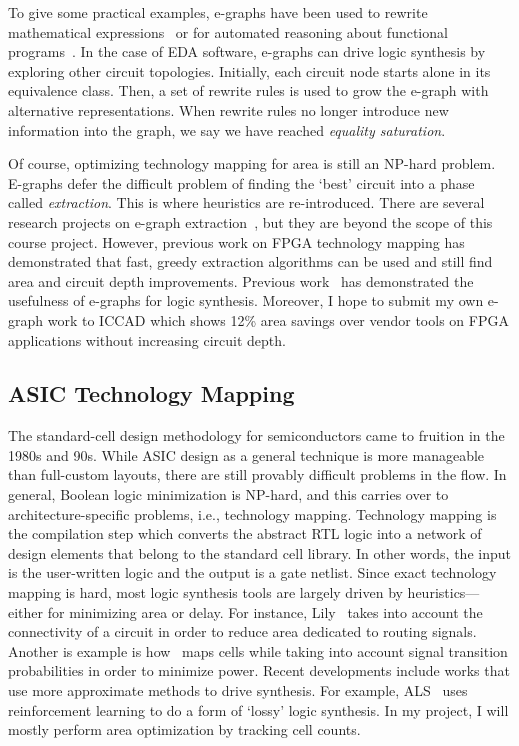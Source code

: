\documentclass[10pt,letterpaper]{article}
\begin{document}
To give some practical examples, e-graphs have been used to rewrite
mathematical expressions~\cite{egraphmath} or for automated reasoning about
functional programs~\cite{cclemma}. In the case of EDA software, e-graphs can
drive logic synthesis by exploring other circuit topologies. Initially, each
circuit node starts alone in its equivalence class. Then, a set of rewrite
rules is used to grow the e-graph with alternative representations. When
rewrite rules no longer introduce new information into the graph, we say we
have reached \textit{equality saturation}.

Of course, optimizing technology mapping for area is still an NP-hard problem.
E-graphs defer the difficult problem of finding the `best' circuit into a phase
called \textit{extraction}. This is where heuristics are re-introduced. There
are several research projects on e-graph
extraction~\cite{smoothe,sparsextract}, but they are beyond the scope of this
course project. However, previous work on FPGA technology mapping has
demonstrated that fast, greedy extraction algorithms can be used and still find
area and circuit depth improvements. Previous work~\cite{esyn} has demonstrated
the usefulness of e-graphs for logic synthesis. Moreover, I hope to submit my
own e-graph work to ICCAD which shows 12\% area savings over vendor tools on
FPGA applications without increasing circuit depth.

\subsection{ASIC Technology Mapping}\label{sec:background:techmapping}

The standard-cell design methodology for semiconductors came to fruition in the
1980s and 90s. While ASIC design as a general technique is more manageable than
full-custom layouts, there are still provably difficult problems in the flow.
In general, Boolean logic minimization is NP-hard, and this carries over to
architecture-specific problems, i.e., technology mapping. Technology mapping is
the compilation step which converts the abstract RTL logic into a network of
design elements that belong to the standard cell library. In other words, the
input is the user-written logic and the output is a gate netlist. Since exact
technology mapping is hard, most logic synthesis tools are largely driven by
heuristics---either for minimizing area or delay. For instance,
Lily~\cite{areamap} takes into account the connectivity of a circuit in order
to reduce area dedicated to routing signals. Another is example is
how~\cite{powermap} maps cells while taking into account signal transition
probabilities in order to minimize power. Recent developments include works
that use more approximate methods to drive synthesis. For example,
ALS~\cite{approxmap} uses reinforcement learning to do a form of `lossy' logic
synthesis. In my project, I will mostly perform area optimization by tracking
cell counts.
\end{document}
